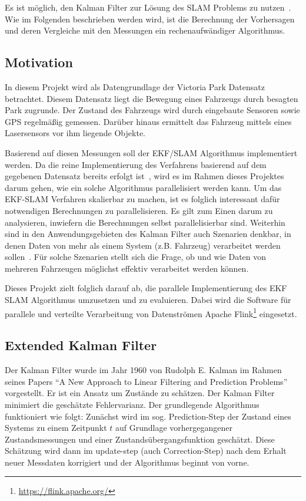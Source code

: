 \documentclass[11pt]{article}
\begin{document}
Es ist möglich, den Kalman Filter zur Lösung des  SLAM Problems zu nutzen~\cite{freiburg_SLAM}. Wie im Folgenden beschrieben werden wird, ist die Berechnung der Vorhersagen und deren Vergleiche mit den Messungen ein rech\-en\-auf\-wän\-di\-ger Algorithmus.

\subsection{Motivation}
In diesem Projekt wird als Datengrundlage der Victoria Park Datensatz betrachtet. Diesem Datensatz liegt die Bewegung eines Fahrzeugs durch besagten Park zugrunde. Der Zustand des Fahrzeugs wird durch eingebaute Sensoren sowie GPS regelmäßig gemessen. Darüber hinaus ermittelt das Fahrzeug mittels eines Lasersensors vor ihm liegende Objekte.

Basierend auf diesen Messungen soll der EKF/SLAM Algorithmus implementiert werden. Da die reine Implementierung des Verfahrens basierend auf dem gegebenen Datensatz bereits erfolgt ist~\cite{ute_SLAM}, wird es im Rahmen dieses Projektes darum gehen, wie ein solche Algorithmus parallelisiert werden kann. Um das EKF-SLAM Verfahren skalierbar zu machen, ist es folglich interessant dafür notwendigen Berechnungen zu parallelisieren. Es gilt zum Einen darum zu analysieren, inwiefern die Berechnungen selbst parallelisierbar sind. Weiterhin sind in den Anwendungsgebieten des Kalman Filter auch Szenarien denkbar, in denen Daten von mehr als einem System (z.B. Fahrzeug) verarbeitet werden sollen~\cite{vessel}. Für solche Szenarien stellt sich die Frage, ob  und wie Daten von mehreren Fahrzeugen möglichst effektiv verarbeitet werden können.

Dieses Projekt zielt folglich darauf ab, die parallele Implementierung des EKF SLAM Algorithmus umzusetzen und zu evaluieren. Dabei wird die Software für parallele und verteilte Verarbeitung von Datenströmen Apache Flink\footnote{\url{https://flink.apache.org/}} eingesetzt.

\subsection{Extended Kalman Filter}
Der Kalman Filter wurde im Jahr 1960 von Rudolph E. Kalman im Rahmen seines Papers “A New Approach to Linear Filtering and Prediction Problems”~\cite{kalman1960new} vorgestellt. Er ist ein Ansatz um Zustände zu schätzen. Der Kalman Filter minimiert die geschätzte Fehlervarianz. Der grundlegende Algorithmus funktioniert wie folgt: Zunächst wird im sog. Prediction-Step der Zustand eines Systems zu einem Zeitpunkt $t$ auf Grundlage vorhergegangener Zustandsmessungen und einer Zustandsübergangsfunktion geschätzt. Diese Schätzung wird dann im update-step (auch Correction-Step) nach dem Erhalt neuer Messdaten korrigiert und der Algorithmus beginnt von vorne.
\end{document}
